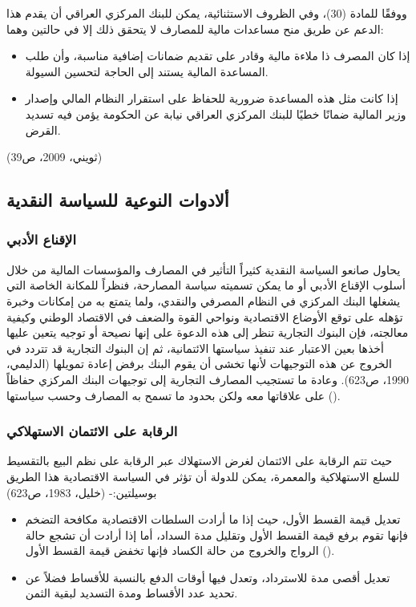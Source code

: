 \documentclass[10pt,a4paper]{report}
\begin{document}
\begin{doublespacing}
ووفقًا للمادة (30)، وفي الظروف الاستثنائية، يمكن للبنك المركزي العراقي أن يقدم هذا الدعم عن طريق منح مساعدات مالية للمصارف لا يتحقق ذلك إلا في حالتين وهما:
\begin{itemize}
	\item إذا كان المصرف ذا ملاءة مالية وقادر على تقديم ضمانات إضافية مناسبة، وأن طلب المساعدة المالية يستند إلى الحاجة لتحسين السيولة.
	\item إذا كانت مثل هذه المساعدة ضرورية للحفاظ على استقرار النظام المالي وإصدار وزير المالية ضمانًا خطيًا للبنك المركزي العراقي نيابة عن الحكومة يؤمن فيه تسديد القرض.
\end{itemize}
({ثويني، 2009، ص39})

\subsection{ألادوات النوعية للسياسة النقدية}
\subsubsection{الإقناع الأدبي}
يحاول صانعو السياسة النقدية كثيراً التأثير في المصارف والمؤسسات المالية من خلال أسلوب الإقناع الأدبي أو ما يمكن تسميته سياسة المصارحة، فنظراً للمكانة الخاصة التي يشغلها البنك المركزي في النظام المصرفي والنقدي، ولما يتمتع به من إمكانات وخبرة تؤهله على توقع الأوضاع الاقتصادية ونواحي القوة والضعف في الاقتصاد الوطني وكيفية معالجته، فإن البنوك التجارية تنظر إلى هذه الدعوة على إنها نصيحة أو توجيه يتعين عليها أخذها بعين الاعتبار عند تنفيذ سياستها الائتمانية، ثم إن البنوك التجارية قد تتردد في الخروج عن هذه التوجيهات لأنها تخشى أن يقوم البنك برفض إعادة تمويلها ({الدليمي، 1990، ص623}). وعادة ما تستجيب المصارف التجارية إلى توجيهات البنك المركزي حفاظاً على علاقاتها معه ولكن بحدود ما تسمح به المصارف وحسب سياستها ().
\subsubsection{الرقابة على الائتمان الاستهلاكي}
حيث تتم الرقابة على الائتمان لغرض الاستهلاك عبر الرقابة على نظم البيع بالتقسيط للسلع الاستهلاكية والمعمرة، يمكن للدولة أن تؤثر في السياسة الاقتصادية هذا الطريق بوسيلتين:- ({خليل، 1983، ص623})
\begin{itemize}
	\item تعديل قيمة القسط الأول، حيث إذا ما أرادت السلطات الاقتصادية مكافحة التضخم فإنها تقوم برفع قيمة القسط الأول وتقليل مدة السداد، أما إذا أرادت أن تشجع حالة الرواج والخروج من حالة الكساد فإنها تخفض قيمة القسط الأول ().
	\item تعديل أقصى مدة للاسترداد، وتعدل فيها أوقات الدفع بالنسبة للأقساط فضلاً عن تحديد عدد الأقساط ومدة التسديد لبقية الثمن.
\end{itemize}

\end{doublespacing}
\end{document}
